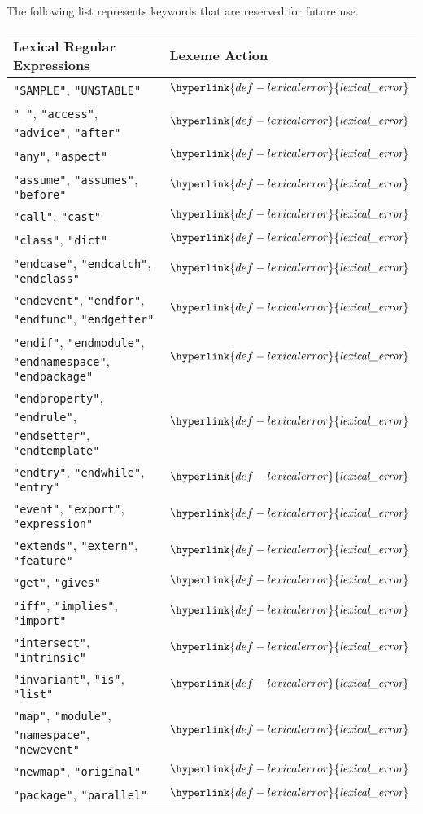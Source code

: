 \documentclass{book}
\newcommand\lexicalerror[0]{\hyperlink{def-lexicalerror}{\textfunc{lexical\_error}}}
\begin{document}
The following list represents keywords that are reserved for future use.
\begin{center}
\begin{tabular}{ll}
\textbf{Lexical Regular Expressions} & \textbf{Lexeme Action}\\
\hline
\texttt{"SAMPLE"}, \texttt{"UNSTABLE"} & $\lexicalerror$ \\
\texttt{"\_"}, \texttt{"access"}, \texttt{"advice"}, \texttt{"after"} & $\lexicalerror$ \\
\texttt{"any"}, \texttt{"aspect"} & $\lexicalerror$ \\
\texttt{"assume"}, \texttt{"assumes"}, \texttt{"before"} & $\lexicalerror$ \\
\texttt{"call"}, \texttt{"cast"} & $\lexicalerror$ \\
\texttt{"class"}, \texttt{"dict"} & $\lexicalerror$ \\
\texttt{"endcase"}, \texttt{"endcatch"}, \texttt{"endclass"} & $\lexicalerror$ \\
\texttt{"endevent"}, \texttt{"endfor"}, \texttt{"endfunc"}, \texttt{"endgetter"} & $\lexicalerror$ \\
\texttt{"endif"}, \texttt{"endmodule"}, \texttt{"endnamespace"}, \texttt{"endpackage"} & $\lexicalerror$ \\
\texttt{"endproperty"}, \texttt{"endrule"}, \texttt{"endsetter"}, \texttt{"endtemplate"} & $\lexicalerror$ \\
\texttt{"endtry"}, \texttt{"endwhile"}, \texttt{"entry"} & $\lexicalerror$ \\
\texttt{"event"}, \texttt{"export"}, \texttt{"expression"} & $\lexicalerror$ \\
\texttt{"extends"}, \texttt{"extern"}, \texttt{"feature"} & $\lexicalerror$ \\
\texttt{"get"}, \texttt{"gives"} & $\lexicalerror$ \\
\texttt{"iff"}, \texttt{"implies"}, \texttt{"import"} & $\lexicalerror$ \\
\texttt{"intersect"}, \texttt{"intrinsic"} & $\lexicalerror$ \\
\texttt{"invariant"}, \texttt{"is"}, \texttt{"list"} & $\lexicalerror$ \\
\texttt{"map"}, \texttt{"module"}, \texttt{"namespace"}, \texttt{"newevent"} & $\lexicalerror$ \\
\texttt{"newmap"}, \texttt{"original"} & $\lexicalerror$ \\
\texttt{"package"}, \texttt{"parallel"} & $\lexicalerror$ \\

\end{tabular}
\end{center}
\end{document}
